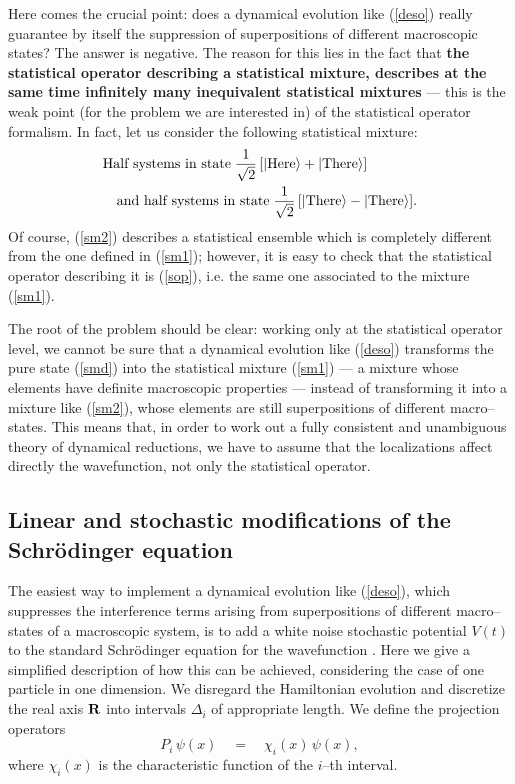 \documentclass[12pt]{article}
\begin{document}
Here comes the crucial point: does a dynamical evolution like
(\ref{deso}) really guarantee by itself the suppression of
superpositions of different macroscopic states? The answer is
negative. The reason for this lies in the fact that {\bf the
statistical operator describing a statistical mixture, describes
at the same time infinitely many inequivalent statistical
mixtures} --- this is the weak point (for the problem we are
interested in) of the statistical operator formalism. In fact, let
us consider the following statistical mixture:
\begin{eqnarray} \label{sm2}
\lefteqn{\makebox{Half systems in state}\;
\frac{1}{\sqrt{2}}\,[|\makebox{Here}\rangle +
|\makebox{There}\rangle]\;} \\
& & \makebox{and half systems in state}\;
\frac{1}{\sqrt{2}}\,[|\makebox{There}\rangle -
|\makebox{There}\rangle].
\end{eqnarray}
Of course, (\ref{sm2}) describes a statistical ensemble which is
completely different from the one defined in (\ref{sm1}); however,
it is easy to check that the statistical operator describing it is
(\ref{sop}), i.e. the same one associated to the mixture
(\ref{sm1}).

The root of the problem should be clear: working only at the
statistical operator level, we cannot be sure that a dynamical
evolution like (\ref{deso}) transforms the pure state (\ref{smd})
into the statistical mixture (\ref{sm1}) --- a mixture whose
elements have definite macroscopic properties --- instead of
transforming it into a mixture like (\ref{sm2}), whose elements
are still superpositions of different macro--states. This means
that, in order to work out a fully consistent and unambiguous
theory of dynamical reductions, we have to assume that the
localizations affect directly the wavefunction, not only the
statistical operator.


\subsection{Linear and stochastic modifications of the Schr\"odinger
equation} \label{sec42}

The easiest way to implement a dynamical evolution like
(\ref{deso}), which suppresses the interference terms arising from
superpositions of different macro--states of a macroscopic system,
is to add a white noise stochastic potential $V(t)$ to the
standard Schr\"odinger equation for the wavefunction \cite{npfs}.
Here we give a simplified description of how this can be achieved,
considering the case of one particle in one dimension. We
disregard the Hamiltonian evolution and discretize the real axis
${\bf R}$ into intervals $\Delta_{i}$ of appropriate length. We
define the projection operators
\begin{equation}
P_{i}\, \psi(x) \quad = \quad \chi_{i}(x)\, \psi(x),
\end{equation}
where $\chi_{i}(x)$ is the characteristic function of the $i$--th
interval.
\end{document}
